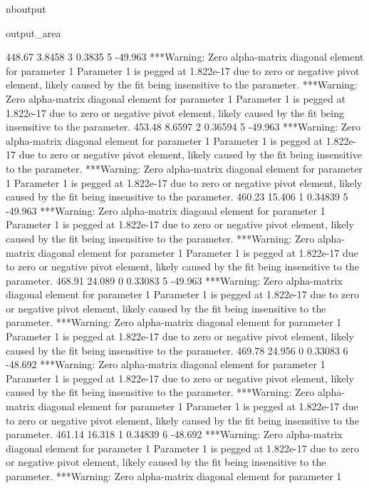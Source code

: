 \documentclass[letterpaper,10pt,english]{sphinxmanual}
\begin{document}
\begin{sphinxuseclass}{nboutput}
{\begin{sphinxuseclass}{output_area}
\begin{sphinxuseclass}{}
\begin{sphinxVerbatim}[commandchars=\\\{\}]
          448.67      3.8458    3      0.3835    5     -49.963
***Warning: Zero alpha-matrix diagonal element for parameter 1
 Parameter 1 is pegged at 1.822e-17 due to zero or negative pivot element, likely
 caused by the fit being insensitive to the parameter.
***Warning: Zero alpha-matrix diagonal element for parameter 1
 Parameter 1 is pegged at 1.822e-17 due to zero or negative pivot element, likely
 caused by the fit being insensitive to the parameter.
          453.48      8.6597    2     0.36594    5     -49.963
***Warning: Zero alpha-matrix diagonal element for parameter 1
 Parameter 1 is pegged at 1.822e-17 due to zero or negative pivot element, likely
 caused by the fit being insensitive to the parameter.
***Warning: Zero alpha-matrix diagonal element for parameter 1
 Parameter 1 is pegged at 1.822e-17 due to zero or negative pivot element, likely
 caused by the fit being insensitive to the parameter.
          460.23      15.406    1     0.34839    5     -49.963
***Warning: Zero alpha-matrix diagonal element for parameter 1
 Parameter 1 is pegged at 1.822e-17 due to zero or negative pivot element, likely
 caused by the fit being insensitive to the parameter.
***Warning: Zero alpha-matrix diagonal element for parameter 1
 Parameter 1 is pegged at 1.822e-17 due to zero or negative pivot element, likely
 caused by the fit being insensitive to the parameter.
          468.91      24.089    0     0.33083    5     -49.963
***Warning: Zero alpha-matrix diagonal element for parameter 1
 Parameter 1 is pegged at 1.822e-17 due to zero or negative pivot element, likely
 caused by the fit being insensitive to the parameter.
***Warning: Zero alpha-matrix diagonal element for parameter 1
 Parameter 1 is pegged at 1.822e-17 due to zero or negative pivot element, likely
 caused by the fit being insensitive to the parameter.
          469.78      24.956    0     0.33083    6     -48.692
***Warning: Zero alpha-matrix diagonal element for parameter 1
 Parameter 1 is pegged at 1.822e-17 due to zero or negative pivot element, likely
 caused by the fit being insensitive to the parameter.
***Warning: Zero alpha-matrix diagonal element for parameter 1
 Parameter 1 is pegged at 1.822e-17 due to zero or negative pivot element, likely
 caused by the fit being insensitive to the parameter.
          461.14      16.318    1     0.34839    6     -48.692
***Warning: Zero alpha-matrix diagonal element for parameter 1
 Parameter 1 is pegged at 1.822e-17 due to zero or negative pivot element, likely
 caused by the fit being insensitive to the parameter.
***Warning: Zero alpha-matrix diagonal element for parameter 1

\end{sphinxVerbatim}
\end{sphinxuseclass}
\end{sphinxuseclass}}
\end{sphinxuseclass}
\end{document}
